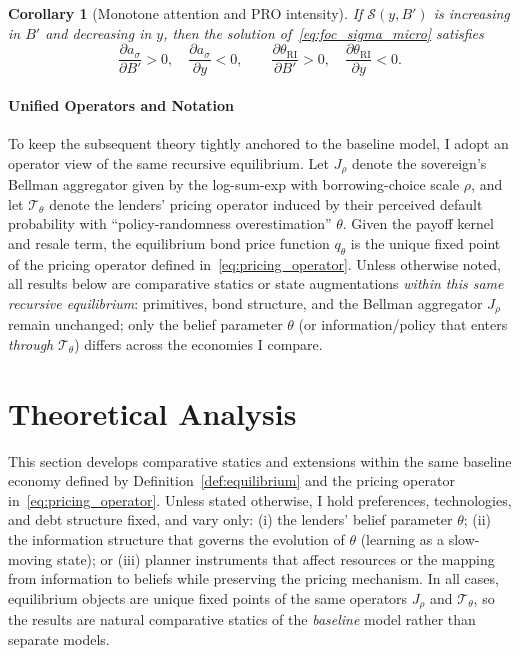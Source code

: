 \documentclass[12pt]{article}
\theoremstyle{plain}
\newtheorem{corollary}{Corollary}
\begin{document}
\begin{corollary}[Monotone attention and PRO intensity]
	\label{cor:monotone_attention}
	If $\mathcal S(y,B')$ is increasing in $B'$ and decreasing in $y$, then the
	solution of~\eqref{eq:foc_sigma_micro} satisfies
	\[
		\frac{\partial a_\sigma}{\partial B'}>0,\quad \frac{\partial a_\sigma}{\partial y}<0,
		\qquad \frac{\partial \theta_{\mathrm{RI}}}{\partial B'}>0,\quad \frac{\partial \theta_{\mathrm{RI}}}{\partial y}<0.
	\]
\end{corollary}

\paragraph{Unified Operators and Notation}
To keep the subsequent theory tightly anchored to the baseline model, I adopt
an operator view of the same recursive equilibrium. Let $J_\rho$ denote the
sovereign's Bellman aggregator given by the log-sum-exp with borrowing-choice
scale $\rho$, and let $\mathcal T_\theta$ denote the lenders' pricing operator
induced by their perceived default probability with ``policy-randomness
overestimation'' $\theta$. Given the payoff kernel and resale term, the
equilibrium bond price function $q_\theta$ is the unique fixed point of the
pricing operator defined in~\eqref{eq:pricing_operator}. Unless otherwise
noted, all results below are comparative statics or state augmentations
\emph{within this same recursive equilibrium}: primitives, bond structure, and
the Bellman aggregator $J_\rho$ remain unchanged; only the belief parameter
$\theta$ (or information/policy that enters \emph{through} $\mathcal T_\theta$)
differs across the economies I compare.

\section{Theoretical Analysis}
\label{sec:theory}

This section develops comparative statics and extensions within the same
baseline economy defined by Definition~\ref{def:equilibrium} and the pricing
operator in~\eqref{eq:pricing_operator}. Unless stated otherwise, I hold
preferences, technologies, and debt structure fixed, and vary only: (i) the
lenders' belief parameter $\theta$; (ii) the information structure that governs
the evolution of $\theta$ (learning as a slow-moving state); or (iii) planner
instruments that affect resources or the mapping from information to beliefs
while preserving the pricing mechanism. In all cases, equilibrium objects are
unique fixed points of the same operators $J_\rho$ and $\mathcal T_\theta$, so
the results are natural comparative statics of the \emph{baseline} model rather
than separate models.
\end{document}
